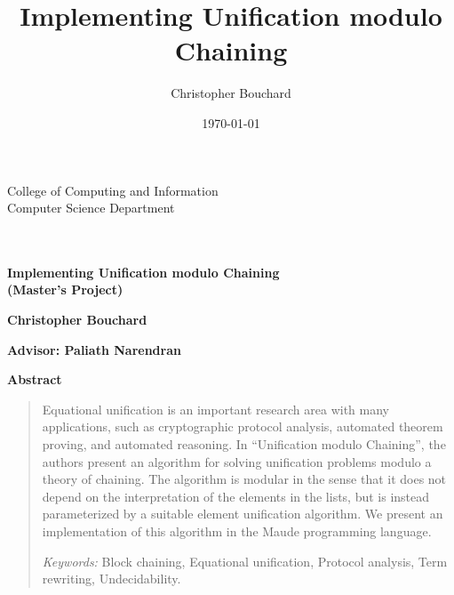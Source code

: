 \documentclass[11pt]{article}
\title{Implementing Unification modulo Chaining}
\author{Christopher Bouchard}
\date{\today}
\begin{document}
\begin{titlepage}
    {\vspace*{-1in}\hspace*{-.5in}
    \parbox{7.25in}{
    \setlength{\baselineskip}{13pt}
    \makebox{\ } \hfill {\footnotesize College of Computing and Information} \\
    \makebox{\ } \hfill {\footnotesize Computer Science Department} \\
    \makebox{\ } \\
    \\
    }
    \vspace{-.95in}}

    \epsfxsize=3.15in
    \epsfclipon

    \vspace*{2in}

    \begin{center}
    \textbf{\huge Implementing Unification modulo Chaining} \\[+15pt]
    \textbf{(Master's Project)}
    \par\end{center}

    \vspace{2in}

    \begin{center}
    \textbf{\large Christopher Bouchard}\\

    \par\end{center}{\large \par}

    \begin{center}
    \textbf{\large \vspace{0.5in}
    Advisor: Paliath Narendran }\textbf{ }
    \par\end{center}
\end{titlepage}

\begin{center}
    \textbf{Abstract}
\end{center}
\begin{quotation}
Equational unification is an important research area with many applications,
such as cryptographic protocol analysis, automated theorem proving, and
automated reasoning. In ``Unification modulo Chaining'', the authors present an
algorithm for solving unification problems modulo a theory of chaining. The
algorithm is modular in the sense that it does not depend on the interpretation
of the elements in the lists, but is instead parameterized by a suitable
element unification algorithm. We present an implementation of this algorithm
in the Maude programming language.

\medskip{}
\textit{Keywords:} Block chaining, Equational unification, Protocol analysis,
Term rewriting, Undecidability.
\end{quotation}
\end{document}

